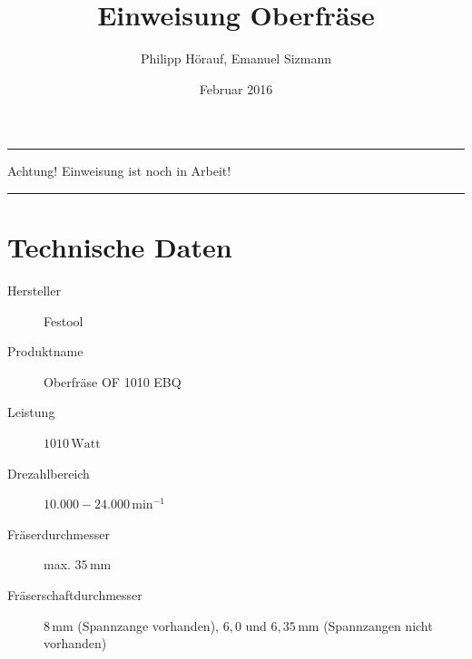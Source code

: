 \documentclass{\basedir/fablab-document}
\date{Februar 2016}
\author{Philipp Hörauf, Emanuel Sizmann}
\title{Einweisung Oberfräse}
\begin{document}
\dosecttoc
\faketableofcontents
{}

\color{red}
\hrule
\begin{center}
\large{Achtung! Einweisung ist noch in Arbeit!}
\vspace{0.1cm}
\end{center}
\hrule
\color{black}

\section{Technische Daten}
\begin{description}
    \item[Hersteller] Festool
    \item[Produktname] Oberfräse OF 1010 EBQ
    \item[Leistung] $1010\,\mathrm{Watt}$
    \item[Drezahlbereich] $10.000 - 24.000\,\mathrm{min}^{-1}$
    \item[Fräserdurchmesser] max. $35\,\mathrm{mm}$
    \item[Fräserschaftdurchmesser] $8\,\mathrm{mm}$ (Spannzange vorhanden), $6,0$ und $6,35\,\mathrm{mm}$ (Spannzangen nicht vorhanden)
    
\end{description}
\end{document}
